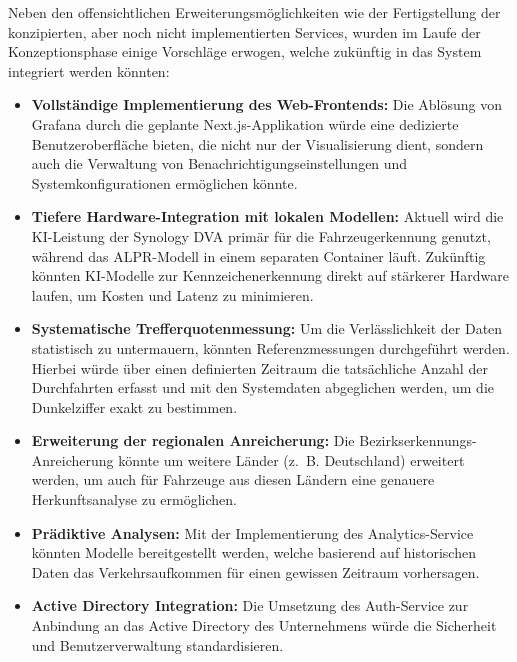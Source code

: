 Neben den offensichtlichen Erweiterungsmöglichkeiten wie der Fertigstellung der konzipierten, aber noch nicht implementierten Services, wurden im Laufe der Konzeptionsphase einige Vorschläge erwogen, welche zukünftig in das System integriert werden könnten:

\begin{itemize}
    \item \textbf{Vollständige Implementierung des Web-Frontends:}
          Die Ablösung von Grafana durch die geplante Next.js-Applikation würde eine dedizierte Benutzeroberfläche bieten, die nicht nur der Visualisierung dient, sondern auch die Verwaltung von Benachrichtigungseinstellungen und Systemkonfigurationen ermöglichen könnte.

    \item \textbf{Tiefere Hardware-Integration mit lokalen Modellen:}
          Aktuell wird die KI-Leistung der Synology DVA primär für die Fahrzeugerkennung genutzt, während das ALPR-Modell in einem separaten Container läuft. Zukünftig könnten KI-Modelle zur Kennzeichenerkennung direkt auf stärkerer Hardware laufen, um Kosten und Latenz zu minimieren.

    \item \textbf{Systematische Trefferquotenmessung:}
          Um die Verlässlichkeit der Daten statistisch zu untermauern, könnten Referenzmessungen durchgeführt werden. Hierbei würde über einen definierten Zeitraum die tatsächliche Anzahl der Durchfahrten erfasst und mit den Systemdaten abgeglichen werden, um die Dunkelziffer exakt zu bestimmen.

    \item \textbf{Erweiterung der regionalen Anreicherung:}
          Die Bezirkserkennungs-Anreicherung könnte um weitere Länder (z.~B. Deutschland) erweitert werden, um auch für Fahrzeuge aus diesen Ländern eine genauere Herkunftsanalyse zu ermöglichen.

    \item \textbf{Prädiktive Analysen:}
          Mit der Implementierung des Analytics-Service könnten Modelle bereitgestellt werden, welche basierend auf historischen Daten das Verkehrsaufkommen für einen gewissen Zeitraum vorhersagen.

    \item \textbf{Active Directory Integration:}
          Die Umsetzung des Auth-Service zur Anbindung an das Active Directory des Unternehmens würde die Sicherheit und Benutzerverwaltung standardisieren.
\end{itemize}
